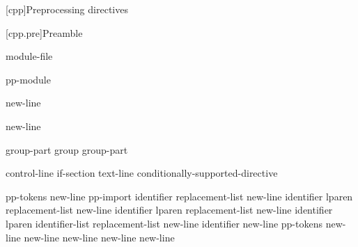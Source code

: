 [cpp]{Preprocessing directives}%

%
%


[cpp.pre]{Preamble}

\begin{bnf}
\br
    \br
    module-file
\end{bnf}

\begin{bnf}
\br
     pp-module  
\end{bnf}

\begin{bnf}
\br
     \terminal{;} new-line 
\end{bnf}

\begin{bnf}
\br
     \terminal{:}  \terminal{;} new-line 
\end{bnf}

\begin{bnf}
\br
    group-part\br
    group group-part
\end{bnf}

\begin{bnf}
\br
    control-line\br
    if-section\br
    text-line\br
    \terminal{\#} conditionally-supported-directive
\end{bnf}

\begin{bnf}\obeyspaces
{}\br
     pp-tokens new-line\br
    pp-import\br
     identifier replacement-list new-line\br
     identifier lparen  \terminal{)} replacement-list new-line\br
     identifier lparen  replacement-list new-line\br
     identifier lparen identifier-list  replacement-list new-line\br
     identifier new-line\br
     pp-tokens new-line\br
      new-line\br
      new-line\br
      new-line\br
    \terminal{\# }new-line
\end{bnf}

